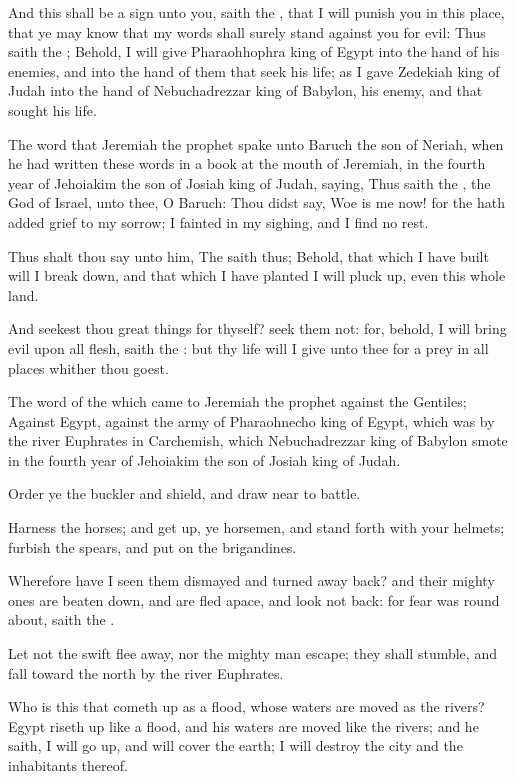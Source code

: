 \Verse And this shall be a sign unto you, saith the \LORD, that I will punish you in this place, that ye may know that my words shall surely stand against you for evil: \Verse Thus saith the \LORD; Behold, I will give Pharaohhophra king of Egypt into the hand of his enemies, and into the hand of them that seek his life; as I gave Zedekiah king of Judah into the hand of Nebuchadrezzar king of Babylon, his enemy, and that sought his life.


\Chapter
\Verse The word that Jeremiah the prophet spake unto Baruch the son of Neriah, when he had written these words in a book at the mouth of Jeremiah, in the fourth year of Jehoiakim the son of Josiah king of Judah, saying, \Verse Thus saith the \LORD, the God of Israel, unto thee, O Baruch: \Verse Thou didst say, Woe is me now! for the \LORD hath added grief to my sorrow; I fainted in my sighing, and I find no rest.

\Verse Thus shalt thou say unto him, The \LORD saith thus; Behold, that which I have built will I break down, and that which I have planted I will pluck up, even this whole land.

\Verse And seekest thou great things for thyself? seek them not: for, behold, I will bring evil upon all flesh, saith the \LORD: but thy life will I give unto thee for a prey in all places whither thou goest.


\Chapter
\Verse The word of the \LORD which came to Jeremiah the prophet against the Gentiles; \Verse Against Egypt, against the army of Pharaohnecho king of Egypt, which was by the river Euphrates in Carchemish, which Nebuchadrezzar king of Babylon smote in the fourth year of Jehoiakim the son of Josiah king of Judah.

\Verse Order ye the buckler and shield, and draw near to battle.

\Verse Harness the horses; and get up, ye horsemen, and stand forth with your helmets; furbish the spears, and put on the brigandines.

\Verse Wherefore have I seen them dismayed and turned away back? and their mighty ones are beaten down, and are fled apace, and look not back: for fear was round about, saith the \LORD.

\Verse Let not the swift flee away, nor the mighty man escape; they shall stumble, and fall toward the north by the river Euphrates.

\Verse Who is this that cometh up as a flood, whose waters are moved as the rivers?  \Verse Egypt riseth up like a flood, and his waters are moved like the rivers; and he saith, I will go up, and will cover the earth; I will destroy the city and the inhabitants thereof.


